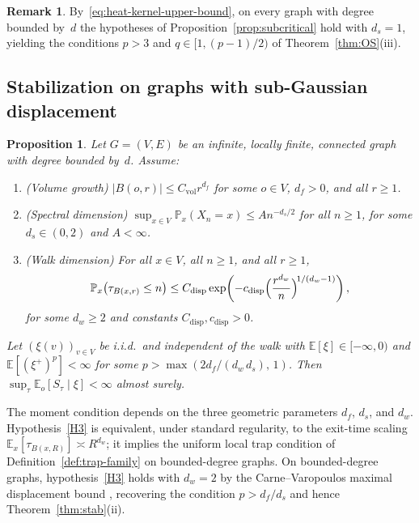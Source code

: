 \documentclass[11pt]{amsart}
\theoremstyle{plain}
\newtheorem{proposition}[theorem]{Proposition}
\theoremstyle{definition}
\newtheorem{remark}[theorem]{Remark}
\newcommand{\E}{\mathbb{E}}
\renewcommand{\P}{\mathbb{P}}
\begin{document}
	\begin{remark}
		By~\eqref{eq:heat-kernel-upper-bound}, on every graph with degree bounded by~$d$ the hypotheses of Proposition~\ref{prop:subcritical} hold with $d_s=1$, yielding the conditions $p>3$ and $q\in[1,(p-1)/2)$ of Theorem~\ref{thm:OS}(iii).
	\end{remark}
	
	\subsection{Stabilization on graphs with sub-Gaussian displacement}\label{sec:poly-growth}
	
	\begin{proposition}\label{prop:poly-growth}
		Let $G=(V,E)$ be an infinite, locally finite, connected graph with degree bounded by~$d$.  Assume:
		\begin{enumerate}[label=\textup{(H\arabic*)}]
			\item\label{H1} \textup{(Volume growth)}\; $|B(o,r)|\leq C_{\mathrm{vol}} r^{d_f}$ for some $o\in V$, $d_f>0$, and all $r\geq 1$.
			\item\label{H2} \textup{(Spectral dimension)}\; $\sup_{x\in V}\P_x(X_n=x)\leq A n^{-d_s/2}$ for all $n\geq 1$, for some $d_s\in(0,2)$ and $A<\infty$.
			\item\label{H3} \textup{(Walk dimension)}\; For all $x\in V$, all $n\geq 1$, and all $r\geq 1$,
			\[
			\P_x\bigl(\tau_{B(x,r)}\leq n\bigr)\leq C_{\mathrm{disp}}\exp\biggl(-c_{\mathrm{disp}}\Bigl(\frac{r^{d_w}}{n}\Bigr)^{\!1/(d_w-1)}\biggr)\,,
			\]
			for some $d_w\geq 2$ and constants $C_{\mathrm{disp}},c_{\mathrm{disp}}>0$.
		\end{enumerate}
		Let $(\xi(v))_{v\in V}$ be i.i.d.\ and independent of the walk with $\E[\xi]\in[-\infty,0)$ and $\E[(\xi^+)^p]<\infty$ for some $p>\max(2d_f/(d_w\,d_s),\,1)$.  Then $\sup_\tau\E_o[S_\tau\mid\xi]<\infty$ almost surely.
	\end{proposition}
	
	The moment condition depends on the three geometric parameters $d_f$, $d_s$, and $d_w$. Hypothesis~\ref{H3} is equivalent, under standard regularity, to the exit-time scaling $\E_x[\tau_{B(x,R)}]\asymp R^{d_w}$; it implies the uniform local trap condition of Definition~\ref{def:trap-family} on bounded-degree graphs. On bounded-degree graphs, hypothesis~\ref{H3} holds with $d_w=2$ by the Carne--Varopoulos maximal displacement bound \citep[Section~13.2]{LP16}, recovering the condition $p>d_f/d_s$ and hence Theorem~\ref{thm:stab}(ii).
	
\end{document}
